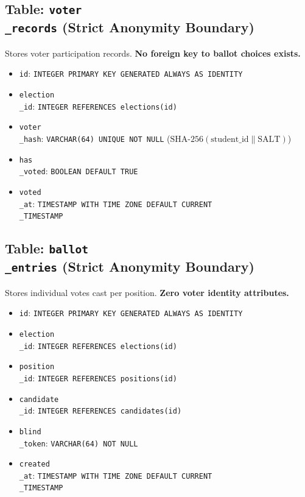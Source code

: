 \documentclass[12pt,a4paper,oneside]{report}
\begin{document}
\subsection{Table: \texttt{voter\\_records} (Strict Anonymity Boundary)}
Stores voter participation records. \textbf{No foreign key to ballot choices exists.}
\begin{itemize}
    \item \texttt{id}: \texttt{INTEGER PRIMARY KEY GENERATED ALWAYS AS IDENTITY}
    \item \texttt{election\\_id}: \texttt{INTEGER REFERENCES elections(id)}
    \item \texttt{voter\\_hash}: \texttt{VARCHAR(64) UNIQUE NOT NULL} ($\text{SHA-256}(\text{student\_id} \parallel \text{SALT})$)
    \item \texttt{has\\_voted}: \texttt{BOOLEAN DEFAULT TRUE}
    \item \texttt{voted\\_at}: \texttt{TIMESTAMP WITH TIME ZONE DEFAULT CURRENT\\_TIMESTAMP}
\end{itemize}

\subsection{Table: \texttt{ballot\\_entries} (Strict Anonymity Boundary)}
Stores individual votes cast per position. \textbf{Zero voter identity attributes.}
\begin{itemize}
    \item \texttt{id}: \texttt{INTEGER PRIMARY KEY GENERATED ALWAYS AS IDENTITY}
    \item \texttt{election\\_id}: \texttt{INTEGER REFERENCES elections(id)}
    \item \texttt{position\\_id}: \texttt{INTEGER REFERENCES positions(id)}
    \item \texttt{candidate\\_id}: \texttt{INTEGER REFERENCES candidates(id)}
    \item \texttt{blind\\_token}: \texttt{VARCHAR(64) NOT NULL}
    \item \texttt{created\\_at}: \texttt{TIMESTAMP WITH TIME ZONE DEFAULT CURRENT\\_TIMESTAMP}
\end{itemize}
\end{document}
